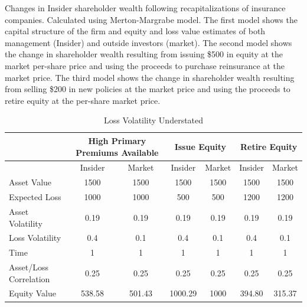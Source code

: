 \begin{table}\caption{Loss Volatility Understated \label{tab:volunder}}
\begin{small}Changes in Insider shareholder wealth following recapitalizations of insurance companies.  Calculated using Merton-Margrabe model.  The first model shows the capital structure of the firm and equity and loss value estimates of both management (Insider) and outside investors (market).  The second model shows the change in shareholder wealth resulting from issuing \$500 in equity at the market per-share price and using the proceeds to purchase reinsurance at the market price.  The third model shows the change in shareholder wealth resulting from selling \$200 in new policies at the market price and using the proceeds to retire equity at the per-share market price.\end{small}
\begin{center}
\begin{tabular}{p{2in}cccccc}
\toprule           & \multicolumn{ 2}{c}{High Primary Premiums Available} & \multicolumn{ 2}{c}{Issue Equity} & \multicolumn{ 2}{c}{Retire Equity} \\ 
\midrule
           &  Insider &     Market &  Insider &     Market &  Insider &     Market \\ 
\midrule
\midrule
Asset Value &       1500 &       1500 &       1500 &       1500 &       1500 &       1500 \\ 

Expected Loss &       1000 &       1000 &        500 &        500 &       1200 &       1200 \\ 

Asset Volatility &       0.19 &       0.19 &       0.19 &       0.19 &       0.19 &       0.19 \\ 

Loss Volatility &        0.4 &        0.1 &        0.4 &        0.1 &        0.4 &        0.1 \\ 

      Time &          1 &          1 &          1 &          1 &          1 &          1 \\ 

Asset/Loss Correlation &       0.25 &       0.25 &       0.25 &       0.25 &       0.25 &       0.25 \\ 
\midrule

Equity Value & 538.58 &    501.43 &   1000.29 &       1000 &    394.80 &   315.37 \\ 


\end{tabular}
\end{center}
\end{table}
